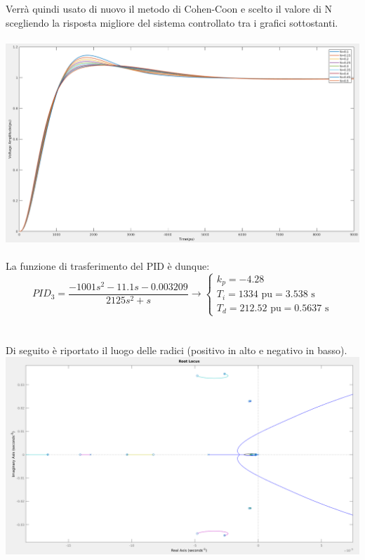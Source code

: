 \documentclass[Lau,noexaminfo]{sapthesis}
\begin{document}
	Verrà quindi usato di nuovo il metodo di Cohen-Coon e scelto il valore di N scegliendo la risposta migliore del sistema controllato tra i grafici sottostanti.\\\\
	\includegraphics[scale=0.32,angle=-90]{vari_N_P3}\\\\
	La funzione di trasferimento del PID è dunque:\\
	\begin{equation}
	PID_3=\frac{-1001s^2-11.1s-0.003209}{2125s^2+s}\rightarrow\begin{cases}
	k_p=-4.28\\
	T_i=1334 \text{ pu} = 3.538\text{ s}\\
	T_d=212.52 \text{ pu} = 0.5637\text{ s}
	\end{cases}
	\end{equation}\\\\
	Di seguito è riportato il luogo delle radici (positivo in alto e negativo in basso).\\
	\includegraphics[scale=0.26]{rlocus_F3_pos}\\
\end{document}
